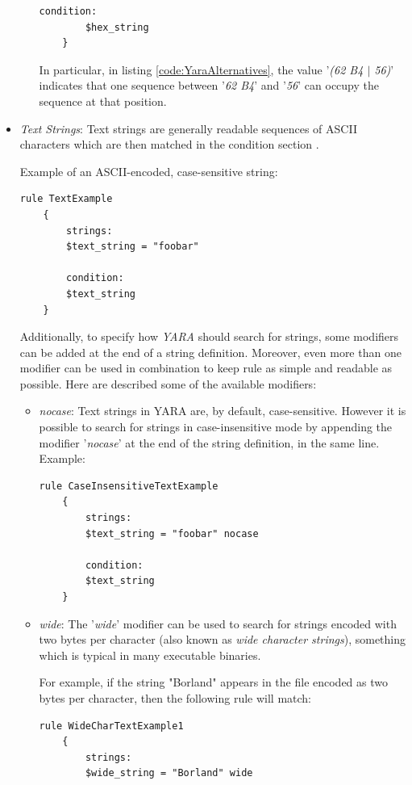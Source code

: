 \documentclass[pdfa%
,cucitura%
]{toptesi}
\begin{document}
\begin{itemize}
\begin{itemize}
\begin{lstlisting}[caption={YARA Hexadecimal Alternatives}, label=code:YaraAlternatives, language=YARA, style=mystyle]
		condition:
		$hex_string
	}
		\end{lstlisting}
	In particular, in listing \ref{code:YaraAlternatives}, the value '\textit{(62 B4 $\vert$ 56)}' indicates that one sequence between '\textit{62 B4}' and '\textit{56}' can occupy the sequence at that position.
	\end{itemize}
	
	\item \textit{Text Strings}:		
	Text strings are generally readable sequences of ASCII characters which are then matched in the condition section \cite{SimonWIY}.
	
	Example of an ASCII-encoded, case-sensitive string:
	\begin{lstlisting}[caption={YARA Text Strings example}, label=code:YaraTextStrings, language=YARA, style=mystyle]
		rule TextExample
	{
		strings:
		$text_string = "foobar"
		
		condition:
		$text_string
	}
	\end{lstlisting}
	
	Additionally, to specify how \textit{YARA} should search for strings, some modifiers can be added at the end of a string definition. Moreover, even more than one modifier can be used in combination to keep rule as simple and readable as possible. Here are described some of the available modifiers:
	\begin{itemize}			
		\item \textit{nocase}: Text strings in YARA are, by default, case-sensitive. However it is possible to search for strings in case-insensitive mode by appending the modifier '\textit{nocase}' at the end of the string definition, in the same line. Example:
		\begin{lstlisting}[caption={YARA nocase example}, label=code:YaraNocase, language=YARA, style=mystyle]
	rule CaseInsensitiveTextExample
	{
		strings:
		$text_string = "foobar" nocase
		
		condition:
		$text_string
	}
		\end{lstlisting}
		
		\item \textit{wide}: The '\textit{wide}' modifier can be used to search for strings encoded with two bytes per character (also known as \textit{wide character strings}), something which is typical in many executable binaries.
		
		For example, if the string "Borland" appears in the file encoded as two bytes per character, then the following rule will match:
		\begin{lstlisting}[caption={YARA Wide Character Strings}, label=code:YaraWideCharacter, language=YARA, style=mystyle]
	rule WideCharTextExample1
	{
		strings:
		$wide_string = "Borland" wide
		

\end{lstlisting}
\end{itemize}
\end{itemize}
\end{document}
